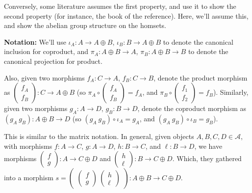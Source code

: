\documentclass{article}
\begin{document}
Conversely, some literature assumes the first property, and use it to show the second property (for instance, the book of the reference). Here, we'll assume this, and show the abelian group structure on the homsets.

\hfil

\textbf{Notation:} We'll use $\iota_A:A\rightarrow A\oplus B$, $\iota_B:B\rightarrow A\oplus B$ to denote the canonical inclusion for coproduct, and $\pi_A:A\oplus B\rightarrow A$, $\pi_B:A\oplus B\rightarrow B$ to denote the canonical projection for product.

Also, given two morphisms $f_A:C\rightarrow A$, $f_B:C\rightarrow B$, denote the product morphism as $\begin{pmatrix}
    f_A\\f_B
\end{pmatrix}:C\rightarrow A\oplus B$ (so $\pi_A\circ \begin{pmatrix}
    f_A\\f_B
\end{pmatrix}=f_A$, and $\pi_B\circ \begin{pmatrix}
    f_1\\f_2
\end{pmatrix}=f_B$). Similarly, given two morphisms $g_A:A\rightarrow D$, $g_B:B\rightarrow D$, denote the coproduct morphism as $(g_A\ g_B):A\oplus B\rightarrow D$ (so $(g_A\ g_B)\circ \iota_A = g_A$, and $(g_A\ g_B)\circ \iota_B = g_B$). 

\hfil

This is similar to the matrix notation. In general, given objects $A,B,C,D\in\mathcal{A}$, with morphisms $f:A\rightarrow C$, $g:A\rightarrow D$, $h:B\rightarrow C$, and $\ell:B\rightarrow D$, we have morphisms $\begin{pmatrix}
    f\\g
\end{pmatrix}:A\rightarrow C\oplus D$ and $\begin{pmatrix}
    h\\ \ell
\end{pmatrix}:B\rightarrow C\oplus D$. Which, they gathered into a morphism $s=\begin{pmatrix}
    \begin{pmatrix}
        f\\g
    \end{pmatrix}\ \begin{pmatrix}
        h\\ \ell
    \end{pmatrix}
\end{pmatrix}:A\oplus B\rightarrow C\oplus D$.
\end{document}
